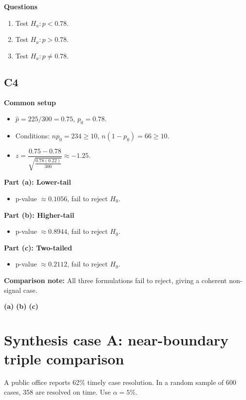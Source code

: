 \textbf{Questions}
\begin{enumerate}
    \item[(a)] Test \(H_a\colon p<0.78\).
    \item[(b)] Test \(H_a\colon p>0.78\).
    \item[(c)] Test \(H_a\colon p\ne0.78\).
\end{enumerate}

\subsection*{C4}
\textbf{Common setup}
\begin{itemize}
    \item \(\hat p=225/300=0.75\), \(p_0=0.78\).
    \item Conditions: \(np_0=234\ge10\), \(n(1-p_0)=66\ge10\).
    \item \(z=\dfrac{0.75-0.78}{\sqrt{\frac{0.78(0.22)}{300}}}\approx -1.25\).
\end{itemize}

\textbf{Part (a): Lower-tail}
\begin{itemize}
    \item p-value \(\approx 0.1056\), fail to reject \(H_0\).
\end{itemize}

\textbf{Part (b): Higher-tail}
\begin{itemize}
    \item p-value \(\approx 0.8944\), fail to reject \(H_0\).
\end{itemize}

\textbf{Part (c): Two-tailed}
\begin{itemize}
    \item p-value \(\approx 0.2112\), fail to reject \(H_0\).
\end{itemize}

\textbf{Comparison note:} All three formulations fail to reject, giving a coherent non-signal case.

\begin{center}
\textbf{(a)}\;
\hspace{0.5cm}
\textbf{(b)}\;
\hspace{0.5cm}
\textbf{(c)}\;
\end{center}


\section{Synthesis case A: near-boundary triple comparison}
A public office reports 62\% timely case resolution. In a random sample of 600 cases, 358 are resolved on time. Use \(\alpha=5\%\).

